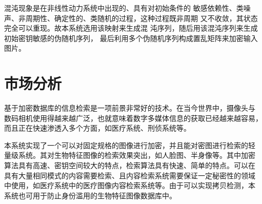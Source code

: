 混沌现象是在非线性动力系统中出现的、具有对初始条件的
敏感依赖性、类噪声、非周期性、确定性的、类随机的过程，这种过程既非周期
又不收敛，其状态完全可以重现\cite{lu2007}。故本系统选用该映射来生成混
沌序列，随后用该混沌序列来生成初始密钥敏感的伪随机序列，
最后利用多个伪随机序列构成置乱矩阵来加密输入图片。

\section{市场分析}
\label{sec:market-analysis}

基于加密数据库的信息检索是一项前景非常好的技术。在当今世界中，摄像头与
数码相机使用得越来越广泛，也就意味着数字多媒体信息的获取已经越来越容易，
而且正在快速渗透入多个方面，如医疗系统、刑侦系统等。

本系统实现了一个可以对固定规格的图像进行加密，并且能对密图进行检索的轻
量级系统。其对生物特征图像的检索效果突出，如人脸图、半身像等。其中加密
算法具有高速、密钥空间较大的特点，检索算法具有快速、简单的特点。可以在
具有大量相同模式的内容需要检索、且内容检索系统需要保证一定秘密性的领域
中使用，如医疗系统中的医疗图像内容检索系统等。由于可以实现拷贝检测，本
系统也可用于防止身份滥用的生物特征图像数据库中。
